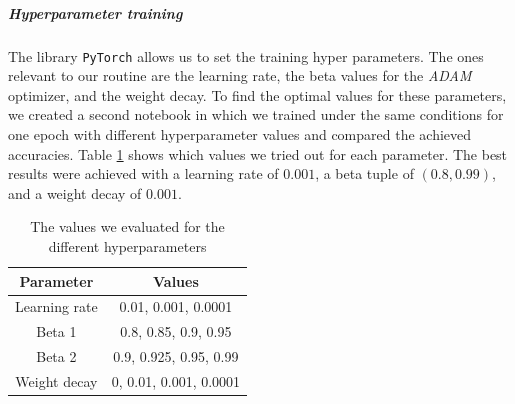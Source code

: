\documentclass[11pt]{article}
\begin{document}
	\subparagraph{Hyperparameter training}
	The library \texttt{PyTorch} allows us to set the training hyper parameters. The ones relevant to our routine are the learning rate, the beta values for the \textit{ADAM} optimizer, and the weight decay. To find the optimal values for these parameters, we created a second notebook in which we trained under the same conditions for one epoch with different hyperparameter values and compared the achieved accuracies. Table \ref{tab:hyperparams} shows which values we tried out for each parameter. The best results were achieved with a learning rate of $0.001$, a beta tuple of $(0.8, 0.99)$, and a weight decay of $0.001$.
	\begin{table}[h!]
		\begin{tabular}{c|c}
			\textbf{Parameter} & \textbf{Values} \\
			\hline
			Learning rate & 0.01, 0.001, 0.0001 \\
			Beta 1 & 0.8, 0.85, 0.9, 0.95 \\
			Beta 2 & 0.9, 0.925, 0.95, 0.99 \\
			Weight decay & 0, 0.01, 0.001, 0.0001
		\end{tabular}
		\caption{The values we evaluated for the different hyperparameters}
		\label{tab:hyperparams}
	\end{table}
	
\end{document}
